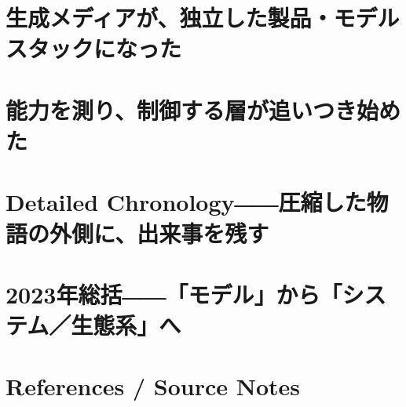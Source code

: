 \documentclass[lualatex,a4paper,11pt]{jlreq}
\begin{document}
\Needspace{0.45\textheight}
\bigskip
\section{生成メディアが、独立した製品・モデルスタックになった}
\label{pkg:generative-media}

\medskip
\begin{multicols}{2}

\end{multicols}


\Needspace{0.45\textheight}
\bigskip
\section{能力を測り、制御する層が追いつき始めた}
\label{pkg:evaluation-control}

\medskip
\begin{multicols}{2}

\end{multicols}


\Needspace{0.45\textheight}
\bigskip
\section{Detailed Chronology――圧縮した物語の外側に、出来事を残す}
\label{pkg:annual-chronology}

\medskip
\begin{multicols}{2}

\end{multicols}

\Needspace{0.45\textheight}
\bigskip
\section{2023年総括――「モデル」から「システム／生態系」へ}
\label{pkg:annual-synthesis}

\medskip
\begin{multicols}{2}

\end{multicols}

\Needspace{0.30\textheight}
\bigskip
{}\par
\smallskip
\section*{References / Source Notes}
\begingroup
\scriptsize
\setlength{\bibitemsep}{0pt}
\begin{multicols}{2}
\raggedright
\printbibliography[heading=none]
\end{multicols}
\endgroup
\end{document}
